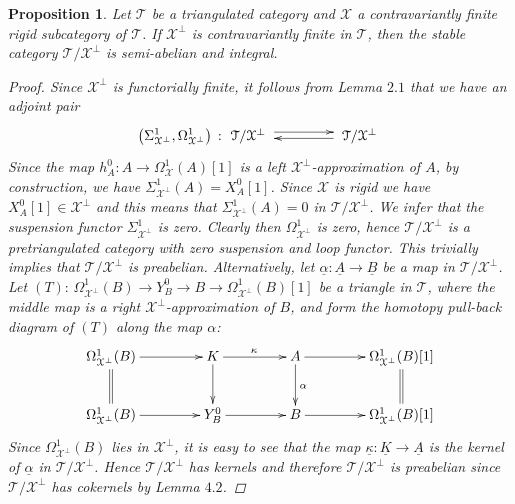 \documentclass[oneside, a4paper,reqno]{amsart}
\numberwithin{equation}{section}
\newtheorem{prop}[thm]{Proposition}
\theoremstyle{definition}
\begin{document}
\begin{prop}  Let ${\mathcal T}$ be a triangulated category and ${\mathcal X}$ a contravariantly finite rigid subcategory of ${\mathcal T}$. If  ${\mathcal X}^{\bot}$ is contravariantly finite in ${\mathcal T}$, then the stable category ${\mathcal T}/{\mathcal X}^{\bot}$ is semi-abelian and integral.
\begin{proof} Since ${\mathcal X}^{\bot}$ is functorially finite, it follows from Lemma $2.1$ that we have an adjoint pair
\[
\big(\Sigma^{1}_{{\mathcal X}^{\bot}},\Omega^{1}_{{\mathcal X}^{\bot}}\big) \  \colon  \xymatrix@C=3.5pc {{\mathcal T}/{\mathcal X}^{\bot} \,\, \ar@<0.75ex>[r]^-{{\mathsf{}}} & \,\, \ar@<0.3ex>[l]^-{{\,\, \mathsf{}}}{\mathcal T}/{\mathcal X}^{\bot}}
\]
Since the map $h^{0}_{A} \colon A {\longrightarrow} \Omega^{1}_{\mathcal X}(A)[1]$ is a left ${\mathcal X}^{\bot}$-approximation of $A$, by construction, we have $\Sigma^{1}_{{\mathcal X}^{\bot}}(A) =  X^{0}_{A}[1]$.  Since ${\mathcal X}$ is rigid we have $X^{0}_{A}[1] \in {\mathcal X}^{\bot}$ and this means that $\Sigma^{1}_{{\mathcal X}^{\bot}}(A) = 0$ in ${\mathcal T}/{\mathcal X}^{\bot}$. We infer that the suspension functor $\Sigma^{1}_{{\mathcal X}^{\bot}}$ is zero. Clearly then $\Omega^{1}_{{\mathcal X}^{\bot}}$ is zero, hence ${\mathcal T}/{\mathcal X}^{\bot}$ is a pretriangulated category with zero suspension and loop functor. This trivially implies that ${\mathcal T}/{\mathcal X}^{\bot}$ is preabelian. Alternatively,  let $\underline{\alpha} \colon {\underline A} {\longrightarrow} {\underline B}$ be a map in ${\mathcal T}/{\mathcal X}^{\bot}$. Let 
$(T) :\, \Omega^{1}_{{\mathcal X}^{\bot}}(B)  {\longrightarrow} Y^{0}_{B} {\longrightarrow} B {\longrightarrow} \Omega^{1}_{{\mathcal X}^{\bot}}(B)[1]$ be a triangle in ${\mathcal T}$, where the middle map is a right ${\mathcal X}^{\bot}$-approximation of $B$, and form the homotopy pull-back diagram of $(T)$ along the map $\alpha$:
\begin{equation}
  \xymatrix@C=1.5cm{
    \Omega^{1}_{{\mathcal X}^{\bot}}(B)  \ar[r]^{}  \ar@{=}[d]  &  
   K \ar[r]^{\kappa}\ar[d]^{}&
    A \ar[d]^{\alpha} \ar[r]^{}&
    \Omega^{1}_{{\mathcal X}^{\bot}}(B)[1] \ar@{=}[d] \\
    \Omega^{1}_{{\mathcal X}^{\bot}}(B) \ar[r]^{}& Y^{0}_{B} \ar[r]^{}& B \ar[r]^{} & \Omega^{1}_{{\mathcal X}^{\bot}}(B)[1]}
\end{equation} 
Since $\Omega^{1}_{{\mathcal X}^{\bot}}(B)$ lies in ${\mathcal X}^{\bot}$, it is easy to see that the map $\underline{\kappa} \colon {\underline K} {\longrightarrow} {\underline A}$ is the kernel of $\underline{\alpha}$ in ${\mathcal T}/{\mathcal X}^{\bot}$. Hence ${\mathcal T}/{\mathcal X}^{\bot}$ has kernels and therefore ${\mathcal T}/{\mathcal X}^{\bot}$ is preabelian since ${\mathcal T}/{\mathcal X}^{\bot}$ has cokernels by Lemma $4.2$.  

\end{proof}
\end{prop}
\end{document}
